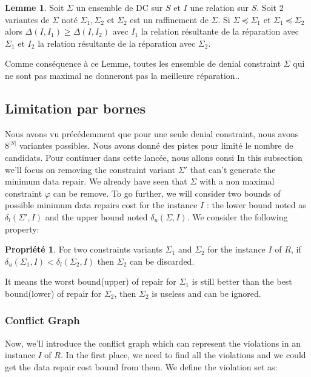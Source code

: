 \documentclass[letterpaper, 12pt]{report}
\theoremstyle{definition}
\newtheorem{myprop}{Propriété}
\newtheorem{mylemma}{Lemme}
\begin{document}
\begin{mylemma}
 Soit $\Sigma$ un ensemble de DC sur $S$ et $I$ une relation sur $S$. Soit 2 variantes de $\Sigma$ noté $\Sigma_1,\Sigma_2$ et $\Sigma_2$ est un raffinement de $\Sigma$. Si $\Sigma \preceq \Sigma_1$ et $\Sigma_1 \preceq \Sigma_2$ alors $\Delta(I,I_1) \geq \Delta(I,I_2)$ avec $I_1$ la relation résultante de la réparation avec $\Sigma_1$ et $I_2$ la relation résultante de la réparation avec $\Sigma_2$.
\end{mylemma}

Comme conséquence à ce Lemme, toutes les ensemble de denial constraint $\Sigma$ qui ne sont pas maximal ne donneront pas la meilleure réparation..

\subsection{Limitation par bornes}

Nous avons vu précédemment que pour une seule denial constraint, nous avons $8^{|S|}$ variantes possibles. Nous avons donné des pistes pour limité le nombre de candidats. Pour continuer dans cette lancée, nous allons consi
In this subsection we'll focus on removing the constraint variant $\Sigma '$ that can't generate the minimum data repair. We already have seen that $\Sigma$ with a non maximal constraint $\varphi$ can be remove. To go further, we will  consider two bounds of possible minimum data repairs cost for the instance $I$ : the lower bound noted as $\delta_l(\Sigma',I)$ and the upper bound noted $\delta_u(\Sigma,I)$. We consider the following property:

\begin{myprop}
\label{boundRemove}
	For two constraints variants $\Sigma_1$ and $\Sigma_2$ for the instance $I$ of $R$, if $\delta_u(\Sigma_1,I) < \delta_l(\Sigma_2,I)$ then $\Sigma_2$ can be discarded.
\end{myprop}

It means the worst bound(upper) of repair for $\Sigma_1$ is still better than the best bound(lower) of repair for $\Sigma_2$, then $\Sigma_2$ is useless and can be ignored.

\subsubsection{Conflict Graph}

Now, we'll introduce the conflict graph which can represent the violations in an instance $I$ of $R$. In the first place, we need to find all the violations and we could get the data repair cost bound from them. We define the violation set as: \cite{main}
\end{document}
